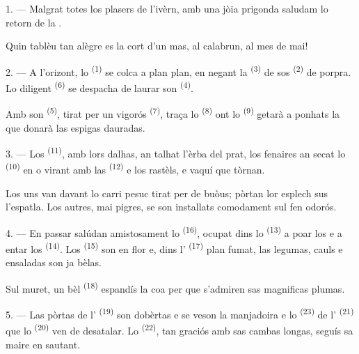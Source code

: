 \VUsaut{3.0mm}
\VUsaut{3.0mm}

\VUsaut{4.0mm}

1. --- Malgrat totes los plasers de l'ivèrn, amb una jòia prigonda saludam lo
retorn de la .

Quin tablèu tan alègre es la cort d'un mas, al calabrun, al mes de mai!

2. --- A l'orizont, lo  \textsuperscript{(1)} se colca a plan
plan, en negant la  \textsuperscript{(3)} de sos 
\textsuperscript{(2)} de porpra. Lo diligent 
\textsuperscript{(6)} se despacha de laurar son 
\textsuperscript{(4)}.

Amb son  \textsuperscript{(5)}, tirat per un vigorós 
\textsuperscript{(7)}, traça lo  \textsuperscript{(8)} ont lo
 \textsuperscript{(9)} getarà a ponhats la  que
donarà las espigas dauradas.

3. --- Los  \textsuperscript{(11)}, amb lors dalhas, an talhat
l'èrba del prat, los fenaires an secat lo  \textsuperscript{(10)} en o
virant amb las  \textsuperscript{(12)} e los rastèls, e vaquí que
tòrnan.

Los uns van davant lo carri pesuc tirat per de buòus; pòrtan lor esplech sus
l'espatla. Los autres, mai pigres, se son installats comodament sul fen odorós.

4. --- En passar salúdan amistosament lo 
\textsuperscript{(16)}, ocupat dins lo  \textsuperscript{(13)} a
poar los  e a entar los 
\textsuperscript{(14)}. Los  \textsuperscript{(15)} son en flor
e, dins l' \textsuperscript{(17)} plan fumat, las legumas, cauls e
ensaladas son ja bèlas.

Sul muret, un bèl  \textsuperscript{(18)} espandís la coa per que
s'admiren sas magnificas plumas.

\VUsaut{3.0mm}

5. --- Las pòrtas de l' \textsuperscript{(19)} son dobèrtas e se
veson la manjadoira e lo  \textsuperscript{(23)} de l'
\textsuperscript{(21)} que lo  \textsuperscript{(20)} ven
de desatalar. Lo  \textsuperscript{(22)}, tan graciós amb sas
cambas longas, seguís sa maire en sautant.

